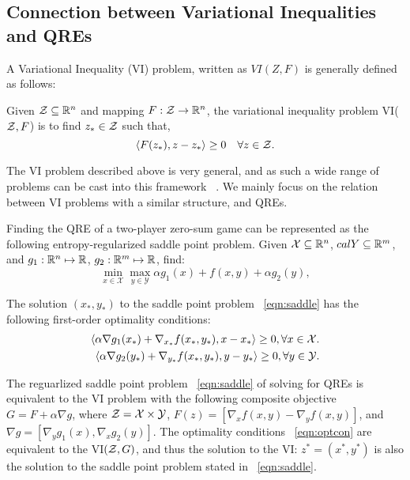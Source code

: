 \subsection{Connection between Variational Inequalities and QREs}
A Variational Inequality (VI) problem, written as $VI(Z, F)$ is generally defined as follows:
\begin{definition}
	\label{def:vi} Given $\mathcal{Z} \subseteq \mathbb{R}^n$ and mapping $F: \mathcal{Z} \rightarrow
		\mathbb{R}^n$, the variational inequality problem VI($\mathcal{Z}, F$) is to find $z_{\ast} \in \mathcal{Z}$ such that,
	\[ \langle F(z_{\ast}), z - z_{\ast} \rangle \geq 0 \quad \forall z \in \mathcal{Z}.
	\]
\end{definition}

The VI problem described above is very general, and as such a wide range of problems can be cast
into this framework~ \cite{facchineiFiniteDimensional2004}.
We mainly focus on the relation between VI problems with a similar structure, and QREs.

Finding the QRE of a two-player zero-sum game can be represented as the following
entropy-regularized saddle point problem.
Given $\mathcal{X} \subseteq \mathbb{R}^n$, $calY \subseteq \mathbb{R}^m$, and $g_1: \mathbb{R}^n \mapsto \mathbb{R}$, $g_2: \mathbb{R}^m \mapsto
	\mathbb{R}$, find:
\begin{equation}
	\label{eqn:saddle} \min_{x \in \mathcal{X}} \max_{y \in \mathcal{Y}}
	\alpha g_1(x) + f(x, y) + \alpha g_2(y),
\end{equation}

The solution
$(x_{\ast}, y_{\ast})$ to the saddle point problem~ \ref{eqn:saddle} has the following first-order
optimality conditions:
\begin{equation}
	\label{eqn:optcon}
	\begin{split}
		\langle \alpha \nabla
		g_1(x_*) + \nabla_{x_*} f(x_*, y_*), x - x_* \rangle \geq 0, \forall x \in \mathcal{X}.
		\\
		\langle \alpha \nabla g_2(y_*) +
		\nabla_{y_*} f(x_*, y_*),
		y - y_* \rangle \geq 0, \forall y \in \mathcal{Y}.
	\end{split}
\end{equation}

The reguarlized saddle point problem~ \ref{eqn:saddle} of solving for QREs is equivalent to the VI
problem with the following composite objective $G = F + \alpha \nabla g$, where $\mathcal{Z} =
	\mathcal{X} \times \mathcal{Y}$, $F(z) = [\nabla_x f(x,y) - \nabla_y f(x,y)]$, and $\nabla g =
	[\nabla_y g_1(x), \nabla_x g_2(y)]$.
The optimality conditions~ \ref{eqn:optcon} are equivalent to the VI$(\mathcal{Z}, G)$, and thus the
solution to the VI: $z^* = (x^*, y^*)$ is also the solution to the saddle point problem stated in~
\ref{eqn:saddle}.

